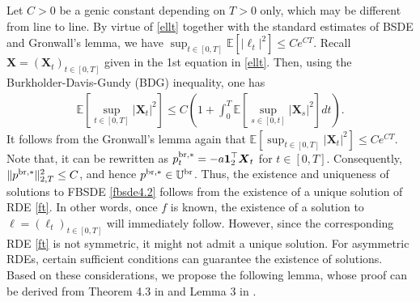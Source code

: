 \documentclass[11pt]{article}
\numberwithin{equation}{section}
\begin{document}
Let $C>0$ be a genic constant depending on $T>0$ only, which may be different from line to line.   
By virtue of \eqref{ellt} together with the standard estimates of BSDE and Gronwall's lemma, we have $\sup_{t\in [0,T]}\mathbb{E}[|\ell_t|^2]\leq Ce^{CT}$. Recall $\boldsymbol{X}=(\boldsymbol{X}_t)_{t\in[0,T]}$ given in the 1st equation in \eqref{ellt}. Then, using the Burkholder-Davis-Gundy (BDG) inequality, one has
\begin{align*}
\mathbb{E}\left[\sup_{t\in [0 ,T]}\left|\boldsymbol{X}_t\right|^2\right]\leq C\left(1+\int_0^T\mathbb{E}\left[\sup_{s\in [0, t]}|\boldsymbol{X}_s|^2\right]dt\right).
\end{align*}
It follows from the Gronwall's lemma again that $\mathbb{E}[\sup_{t\in [0,T]}|\boldsymbol{X}_t|^2]\leq Ce^{CT}$. Note that, it can be rewritten as $p_t^{{\rm br},*}=-a\boldsymbol{1}_2^{\top}\boldsymbol{X}_t$ for $t\in[0,T]$. Consequently, $\Vert p^{{\rm br},*} \Vert_{2,T}^2\leq C$, and hence $p^{{\rm br},*}\in \mathbb{U}^{\rm br}$. 
Thus, the existence and uniqueness of solutions to FBSDE \eqref{fbsde4.2} follows from the existence of a unique solution of RDE \eqref{ft}. In other words, once $f$ is known, the existence of a solution to $\ell=(\ell_t)_{t\in[0,T]}$ will immediately follow.
However, since the corresponding RDE \eqref{ft} is not symmetric, it might not admit a unique solution. For asymmetric RDEs, certain sufficient conditions can guarantee the existence of solutions. Based on these considerations, we propose the following lemma, whose proof can be derived from Theorem 4.3 in \cite{MY99} and Lemma 3 in \cite{MB18}.
\end{document}
